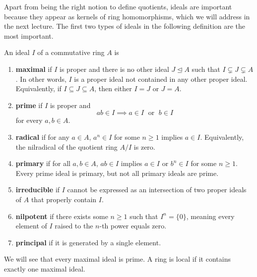 \documentclass[11pt,a4paper]{article}
\begin{document}
Apart from being the right notion to define quotients, ideals are important because they 
appear as kernels of ring homomorphisms, which we will address in the next lecture.
The first two types of ideals in the following definition are the most important.
\begin{defi}
    An ideal \(I\) of a commutative ring \(A\) is 
    \begin{enumerate}[label=(\roman*)]
        \item \textbf{maximal} if \(I\) is proper and there is no other ideal \(J \trianglelefteq A\) such that \(I\subsetneq J \subsetneq A\). In other words, \(I\) is a proper ideal not contained in any other proper ideal. Equivalently, if \(I\subseteq J\subseteq A\), then either \(I=J\) or \(J=A\).
        \item \textbf{prime} if \(I\) is proper and 
        \[ab\in I \implies a\in I\;\text{ or }\; b\in I\] for every \(a,b\in A\).
        \item \textbf{radical} if for any \(a \in A\), \(a^n \in I\) for some \(n \geq 1\) implies \(a \in I\). Equivalently, the nilradical of the quotient ring \(A/I\) is zero.
        \item \textbf{primary} if for all \(a, b \in A\), \(ab \in I\) implies \(a \in I\) or \(b^n \in I\) for some \(n \geq 1\). Every prime ideal is primary, but not all primary ideals are prime.
        \item \textbf{irreducible} if \(I\) cannot be expressed as an intersection of two proper ideals of \(A\) that properly contain \(I\).
        \item \textbf{nilpotent} if there exists some \(n \geq 1\) such that \(I^n = \{0\}\), meaning every element of \(I\) raised to the \(n\)-th power equals zero.
        \item \textbf{principal} if it is generated by a single element.
    \end{enumerate}
\end{defi}

We will see that every maximal ideal is prime.
A ring is local if it contains exactly one maximal ideal.
\end{document}
